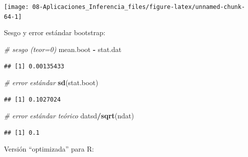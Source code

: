 \documentclass[]{book}
\newenvironment{Shaded}{\begin{snugshade}}{\end{snugshade}}
\newcommand{\KeywordTok}[1]{\textcolor[rgb]{0.13,0.29,0.53}{\textbf{#1}}}
\newcommand{\StringTok}[1]{\textcolor[rgb]{0.31,0.60,0.02}{#1}}
\newcommand{\CommentTok}[1]{\textcolor[rgb]{0.56,0.35,0.01}{\textit{#1}}}
\newcommand{\OperatorTok}[1]{\textcolor[rgb]{0.81,0.36,0.00}{\textbf{#1}}}
\newcommand{\NormalTok}[1]{#1}
\theoremstyle{definition}
\theoremstyle{definition}
\theoremstyle{definition}
\theoremstyle{remark}
\begin{document}
\begin{center}\texttt{[image: 08-Aplicaciones\_Inferencia\_files/figure-latex/unnamed-chunk-64-1]} \end{center}

Sesgo y error estándar bootstrap:

\begin{Shaded}
\begin{Highlighting}[]
\CommentTok{# sesgo (teor=0)}
\NormalTok{mean.boot }\OperatorTok{-}\StringTok{ }\NormalTok{stat.dat }
\end{Highlighting}
\end{Shaded}

\begin{verbatim}
## [1] 0.00135433
\end{verbatim}

\begin{Shaded}
\begin{Highlighting}[]
\CommentTok{# error estándar}
\KeywordTok{sd}\NormalTok{(stat.boot) }
\end{Highlighting}
\end{Shaded}

\begin{verbatim}
## [1] 0.1027024
\end{verbatim}

\begin{Shaded}
\begin{Highlighting}[]
\CommentTok{# error estándar teórico}
\NormalTok{datsd}\OperatorTok{/}\KeywordTok{sqrt}\NormalTok{(ndat) }
\end{Highlighting}
\end{Shaded}

\begin{verbatim}
## [1] 0.1
\end{verbatim}

Versión ``optimizada'' para R:
\end{document}
